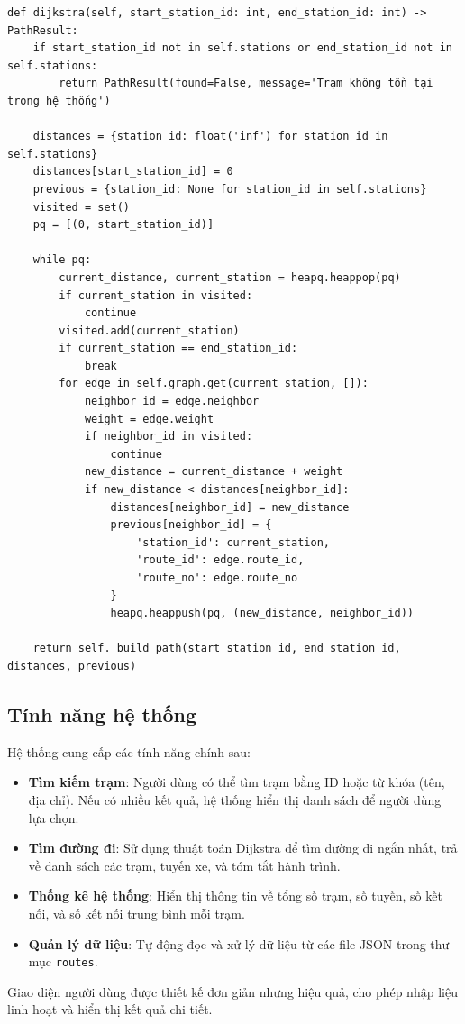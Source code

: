 \documentclass[a4paper,12pt]{article}
\begin{document}
\begin{verbatim}
def dijkstra(self, start_station_id: int, end_station_id: int) -> PathResult:
    if start_station_id not in self.stations or end_station_id not in self.stations:
        return PathResult(found=False, message='Trạm không tồn tại trong hệ thống')
    
    distances = {station_id: float('inf') for station_id in self.stations}
    distances[start_station_id] = 0
    previous = {station_id: None for station_id in self.stations}
    visited = set()
    pq = [(0, start_station_id)]
    
    while pq:
        current_distance, current_station = heapq.heappop(pq)
        if current_station in visited:
            continue
        visited.add(current_station)
        if current_station == end_station_id:
            break
        for edge in self.graph.get(current_station, []):
            neighbor_id = edge.neighbor
            weight = edge.weight
            if neighbor_id in visited:
                continue
            new_distance = current_distance + weight
            if new_distance < distances[neighbor_id]:
                distances[neighbor_id] = new_distance
                previous[neighbor_id] = {
                    'station_id': current_station,
                    'route_id': edge.route_id,
                    'route_no': edge.route_no
                }
                heapq.heappush(pq, (new_distance, neighbor_id))
    
    return self._build_path(start_station_id, end_station_id, distances, previous)
\end{verbatim}

\subsection{Tính năng hệ thống}
Hệ thống cung cấp các tính năng chính sau:
\begin{itemize}
    \item \textbf{Tìm kiếm trạm}: Người dùng có thể tìm trạm bằng ID hoặc từ khóa (tên, địa chỉ). Nếu có nhiều kết quả, hệ thống hiển thị danh sách để người dùng lựa chọn.
    \item \textbf{Tìm đường đi}: Sử dụng thuật toán Dijkstra để tìm đường đi ngắn nhất, trả về danh sách các trạm, tuyến xe, và tóm tắt hành trình.
    \item \textbf{Thống kê hệ thống}: Hiển thị thông tin về tổng số trạm, số tuyến, số kết nối, và số kết nối trung bình mỗi trạm.
    \item \textbf{Quản lý dữ liệu}: Tự động đọc và xử lý dữ liệu từ các file JSON trong thư mục \texttt{routes}.
\end{itemize}
Giao diện người dùng được thiết kế đơn giản nhưng hiệu quả, cho phép nhập liệu linh hoạt và hiển thị kết quả chi tiết.
\end{document}
